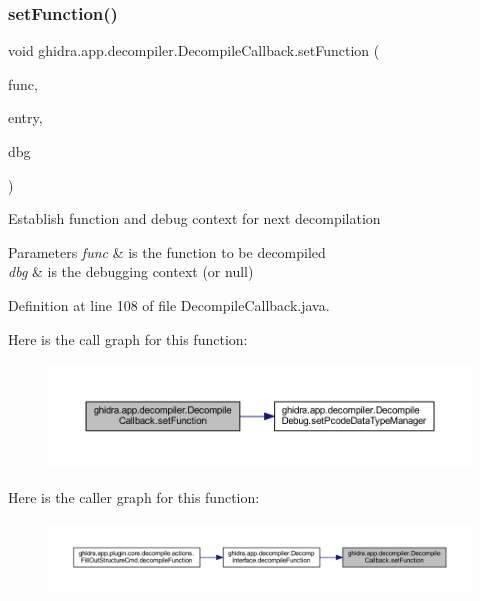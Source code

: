 \subsubsection{\texorpdfstring{setFunction()}{setFunction()}}
{\footnotesize\ttfamily void ghidra.\+app.\+decompiler.\+Decompile\+Callback.\+set\+Function (\begin{DoxyParamCaption}\item[{Function}]{func,  }\item[{\mbox{\hyperlink{class_address}{Address}}}]{entry,  }\item[{\mbox{\hyperlink{classghidra_1_1app_1_1decompiler_1_1_decompile_debug}{Decompile\+Debug}}}]{dbg }\end{DoxyParamCaption})\hspace{0.3cm}{\ttfamily [inline]}}

Establish function and debug context for next decompilation


\begin{DoxyParams}{Parameters}
{\em func} & is the function to be decompiled \\
\hline
{\em dbg} & is the debugging context (or null) \\
\hline
\end{DoxyParams}


Definition at line 108 of file Decompile\+Callback.\+java.

Here is the call graph for this function\+:
\nopagebreak
\begin{figure}[H]
\begin{center}
\leavevmode
\includegraphics[width=350pt]{classghidra_1_1app_1_1decompiler_1_1_decompile_callback_ad1f1579f35c368cd5daa2a698e325d76_cgraph}
\end{center}
\end{figure}
Here is the caller graph for this function\+:
\nopagebreak
\begin{figure}[H]
\begin{center}
\leavevmode
\includegraphics[width=350pt]{classghidra_1_1app_1_1decompiler_1_1_decompile_callback_ad1f1579f35c368cd5daa2a698e325d76_icgraph}
\end{center}
\end{figure}
\mbox{\label{classghidra_1_1app_1_1decompiler_1_1_decompile_callback_a231f5ee7ae38619c786870ec0bd45744}} 
